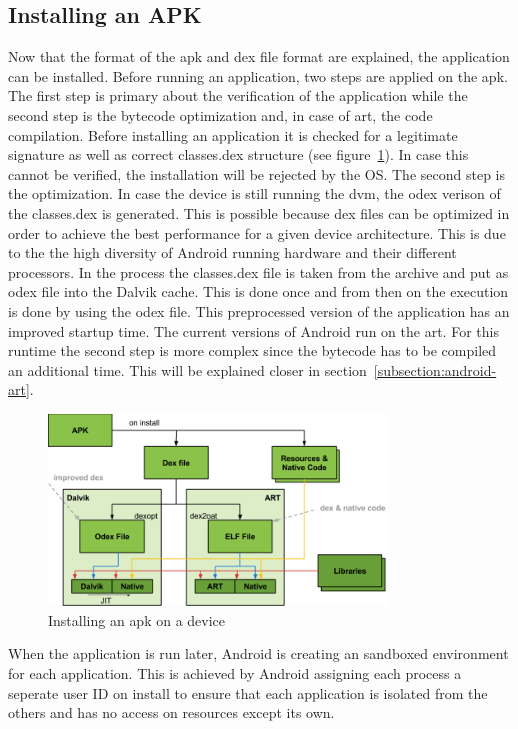 \subsection{Installing an APK} \label{subsection:android-install}
Now that the format of the \gls{apk} and \gls{dex} file format are explained, the application can be installed.
Before running an application, two steps are applied on the \gls{apk}.
The first step is primary about the verification of the application while the second step is the bytecode optimization and, in case of \gls{art}, the code compilation.
Before installing an application it is checked for a legitimate signature as well as correct classes.dex structure (see figure~\ref{fig:install}).
In case this cannot be verified, the installation will be rejected by the OS.
The second step is the optimization.
In case the device is still running the \gls{dvm}, the \gls{odex} verison of the classes.dex is generated.
This is possible because \gls{dex} files can be optimized in order to achieve the best performance for a given device architecture.
This is due to the the high diversity of Android running hardware and their different processors.
In the process the classes.dex file is taken from the archive and put as \gls{odex} file into the Dalvik cache.
This is done once and from then on the execution is done by using the \gls{odex} file.
This preprocessed version of the application has an improved startup time. \cite{kovachevaMaster}
The current versions of Android run on the \gls{art}.
For this runtime the second step is more complex since the bytecode has to be compiled an additional time.
This will be explained closer in section~\ref{subsection:android-art}.
\newline
\begin{figure}[h]
    \centering
    \includegraphics[width=0.8\textwidth]{data/install.png}
    \caption{Installing an \gls{apk} on a device \cite{googleIOArt}}
    \label{fig:install}
\end{figure}

When the application is run later, Android is creating an sandboxed environment for each application.
This is achieved by Android assigning each process a seperate user ID on install to ensure that each application is isolated from the others and has no access on resources except its own. \cite{developerFundamentals}
